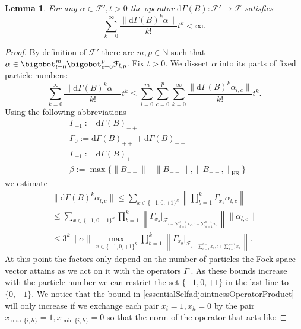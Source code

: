 \documentclass[b5paper,draft,openbib,12pt]{memoir}
\newtheorem{Lemma}[Def]{Lemma}
\begin{document}
\begin{Lemma}\label{Gamma exponential bound}
For any \( \alpha \in \mathcal{F}', t>0\) the operator \(\mathrm{d}\Gamma(B):\mathcal{F}'\rightarrow \mathcal{F}\) satisfies
\begin{equation}
\sum_{k=0}^\infty \frac{\|\mathrm{d}\Gamma(B)^k \alpha\|}{k!} t^k <\infty.
\end{equation}
\end{Lemma}
\begin{proof}
 By definition of \(\mathcal{F}'\) there are \(m,p\in\mathbb{N}\) such that \(\alpha \in \bigobot_{l=0}^m\bigobot_{c=0}^p \mathcal{F}_{l,p}\). Fix \(t>0\). 
We dissect \(\alpha\) into its parts of fixed particle numbers:
\begin{equation}
\sum_{k=0}^\infty \frac{\|\mathrm{d}\Gamma(B)^k \alpha\|}{k!} t^k \le \sum_{l=0}^m\sum_{c=0}^p \sum_{k=0}^\infty \frac{\|\mathrm{d}\Gamma(B)^k \alpha_{l,c}\|}{k!} t^k .
\end{equation}
 Using the following abbreviations
\begin{align}
&\Gamma_{-1}:=\mathrm{d}\Gamma(B)_{-+}\\
&\Gamma_0:=\mathrm{d}\Gamma(B)_{++}+\mathrm{d}\Gamma(B)_{--}\\
&\Gamma_{+1}:=\mathrm{d}\Gamma(B)_{+-}\\
&\beta:=\max\{\|B_{++}\|+\|B_{--}\|,\|B_{-+},\|_{\mathrm{HS}}\}
\end{align}
we estimate
\begin{align}\nonumber
\|\mathrm{d}\Gamma(B)^k \alpha_{l,c}\|\le \sum_{x\in \{-1,0,+1\}^k} \left\| \prod_{b=1}^k \Gamma_{x_b}\alpha_{l,c}\right\|\\\label{essentialSelfadjointnessOperatorProduct}
\le  \sum_{x\in \{-1,0,+1\}^k} \prod_{b=1}^k \left\| \Gamma_{x_b}|_{\mathcal{F}_{l+\sum_{d=1}^{b-1} x_d,c+\sum_{d=1}^{b-1} x_d}}\right\| \|\alpha_{l,c}\|\\
\le 3^k \|\alpha\| \max_{x\in \{-1,0,+1\}^k} \prod_{b=1}^k\left\| \Gamma_{x_b}|_{\mathcal{F}_{l+\sum_{d=1}^{b-1} x_d,c+\sum_{d=1}^{b-1} x_d}}\right\|  .
\end{align}
At this point the factors only depend on the number of particles the Fock space vector attains as we act on it with the operators \(\Gamma_{\cdot}\). 
As these bounds increase with the particle number we can restrict the set \(\{-1,0,+1\}\) in the last line to \(\{0,+1\}\).
We notice that the bound in \eqref{essentialSelfadjointnessOperatorProduct} will only increase if  we exchange each pair 
\(x_{i}=1, x_{h}=0\) by the pair \(x_{\max\{i,h\}}=1, x_{\min\{i,h\}}=0\) so that the norm of the operator that acts like

\end{proof}
\end{document}
